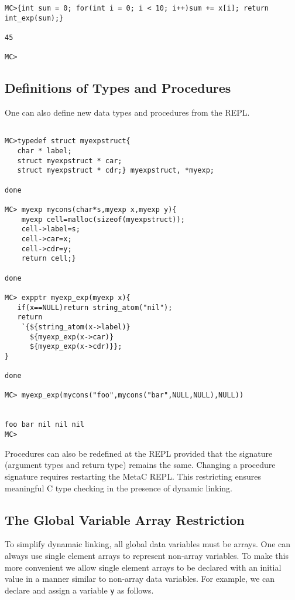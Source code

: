 \documentclass{article}
\begin{document}
\begin{verbatim}
MC>{int sum = 0; for(int i = 0; i < 10; i++)sum += x[i]; return int_exp(sum);}

45

MC>
\end{verbatim}

\subsection{Definitions of Types and Procedures}

One can also define new data types and procedures from the REPL.

\begin{verbatim}

MC>typedef struct myexpstruct{
   char * label;
   struct myexpstruct * car;
   struct myexpstruct * cdr;} myexpstruct, *myexp;

done

MC> myexp mycons(char*s,myexp x,myexp y){
    myexp cell=malloc(sizeof(myexpstruct));
    cell->label=s;
    cell->car=x;
    cell->cdr=y;
    return cell;}

done

MC> expptr myexp_exp(myexp x){
   if(x==NULL)return string_atom("nil");
   return
    `{${string_atom(x->label)}
      ${myexp_exp(x->car)}
      ${myexp_exp(x->cdr)}};
}

done

MC> myexp_exp(mycons("foo",mycons("bar",NULL,NULL),NULL))


foo bar nil nil nil
MC>
\end{verbatim}

Procedures can also be redefined at the REPL provided that the
signature (argument types and return type) remains the same. Changing a procedure signature
requires restarting the MetaC REPL.  This restricting ensures
meaningful C type checking in the presence of dynamic linking.

\subsection{The Global Variable Array Restriction}

To simplify dynamaic linking, all global data
variables must be arrays. One can always use single element
arrays to represent non-array variables.  To make this more convenient
we allow single element arrays to be declared with an initial value in a
manner similar to non-array data variables.  For example, we can declare and assign a variable {\tt y}
as follows.
\end{document}

